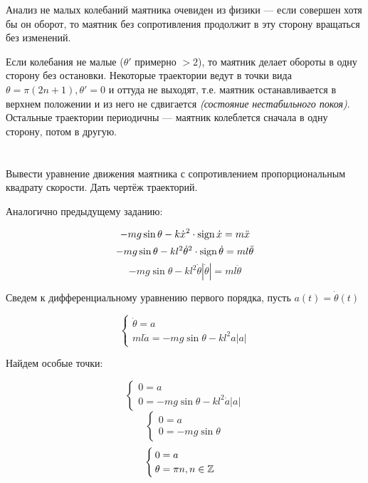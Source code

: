 Анализ не малых колебаний маятника очевиден из физики --- если совершен хотя бы он оборот, то маятник без сопротивления продолжит в эту сторону вращаться без изменений.

\begin{figure}[h]
    \centering
    
\end{figure}

Если колебания не малые (\(\theta'\) примерно \( > 2\)), то маятник делает обороты в одну сторону без остановки. Некоторые траектории ведут в точки вида \(\theta = \pi (2n + 1), \theta' = 0\) и оттуда не выходят, т.е. маятник останавливается в верхнем положении и из него не сдвигается \textit{(состояние нестабильного покоя)}. Остальные траектории периодичны --- маятник колеблется сначала в одну сторону, потом в другую.

\section{}

Вывести уравнение движения маятника с сопротивлением пропорциональным квадрату скорости. Дать чертёж траекторий.

Аналогично предыдущему заданию:

\[ - mg \sin \theta - k \dot x^2 \cdot \operatorname{\text{sign}} \dot x = m\ddot x\]
\[ - mg \sin \theta - kl^2 \dot \theta^2 \cdot \operatorname{\text{sign}} \dot \theta = ml\ddot \theta\]
\[ - mg \sin \theta - kl^2 \dot \theta |\dot \theta| = ml\ddot \theta\]

Сведем к дифференциальному уравнению первого порядка, пусть \(a(t) = \dot \theta(t)\)

\[\begin{cases}
        \dot \theta = a \\
        ml \dot a = - mg \sin \theta - kl^2 a|a|
    \end{cases}\]

Найдем особые точки:

\[\begin{cases}
        0 = a \\
        0 = - mg \sin \theta - kl^2 \dot a|a|
    \end{cases}\]
\[\begin{cases}
        0 = a \\
        0 = - mg \sin \theta
    \end{cases}\]
\[\begin{cases}
        0 = a \\
        \theta = \pi n, n\in\mathbb{Z}
    \end{cases}\]


